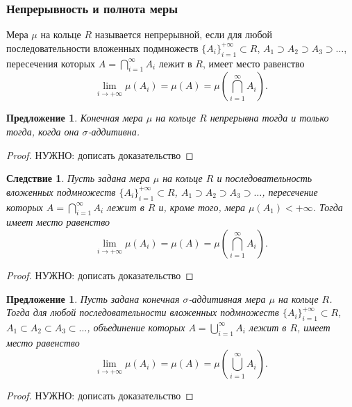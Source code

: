 \documentclass[12pt]{article}
\newtheorem{proposition}[theorem]{Предложение}
\newtheorem{corollary}[theorem]{Следствие}
\numberwithin{theorem}{section}
\theoremstyle{definition}
\newcommand{\defin}[2]{\hypertarget{#2}{{\color{red} #1}}}
\newcommand{\TODO}[1]{\textcolor{todocolor}{НУЖНО: #1}}
\begin{document}
	\subsubsection{Непрерывность и полнота меры}
	
	Мера $ \mu $ на кольце $ R $ называется \defin{непрерывной}{continuous-measure},
	если для любой последовательности вложенных подмножеств $ \{A_i\}_{i = 1}^{+\infty} \subset R $,
	$ A_1 \supset A_2 \supset A_3 \supset \ldots $, пересечения которых $ A = \bigcap\limits_{i = 1}^{\infty} A_i $
	лежит в $ R $,
	имеет место равенство
	$$ \lim\limits_{i \to +\infty} \mu(A_i) = \mu(A) = \mu\left(\bigcap\limits_{i = 1}^{\infty} A_i\right). $$
	
	\begin{proposition}
		Конечная мера $ \mu $ на кольце $ R $ непрерывна тогда и только тогда, когда она $ \sigma $-аддитивна.
	\end{proposition}
	
	\begin{proof}
		\TODO{дописать доказательство}
	\end{proof}
	
	\begin{corollary}
		Пусть задана мера $ \mu $ на кольце $ R $
		и последовательность вложенных подмножеств $ \{A_i\}_{i = 1}^{+\infty} \subset R $,
		$ A_1 \supset A_2 \supset A_3 \supset \ldots $, пересечение которых $ A = \bigcap\limits_{i = 1}^{\infty} A_i $
		лежит в $ R $ и, кроме того, мера $ \mu(A_1) < +\infty $. Тогда
		имеет место равенство
		$$ \lim\limits_{i \to +\infty} \mu(A_i) = \mu(A) = \mu\left(\bigcap\limits_{i = 1}^{\infty} A_i\right). $$
	\end{corollary}
	
	\begin{proof}
		\TODO{дописать доказательство}
	\end{proof}
	
	\begin{proposition}
		Пусть задана конечная $ \sigma $-аддитивная мера $ \mu $ на кольце $ R $.
		Тогда для любой последовательности вложенных подмножеств $ \{A_i\}_{i = 1}^{+\infty} \subset R $,
		$ A_1 \subset A_2 \subset A_3 \subset \ldots $, объединение которых $ A = \bigcup\limits_{i = 1}^{\infty} A_i $
		лежит в $ R $,
		имеет место равенство
		$$ \lim\limits_{i \to +\infty} \mu(A_i) = \mu(A) = \mu\left(\bigcup\limits_{i = 1}^{\infty} A_i\right). $$
	\end{proposition}
	
	\begin{proof}
		\TODO{дописать доказательство}
	\end{proof}
	
\end{document}
